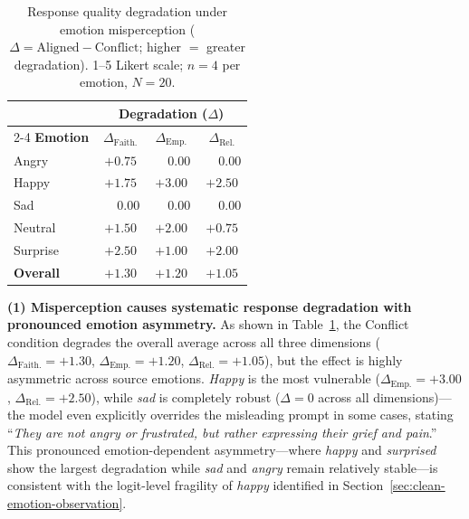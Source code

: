 \begin{table}[!t]
\centering
\small
\caption{Response quality degradation under emotion misperception ($\Delta = \text{Aligned} - \text{Conflict}$; higher $=$ greater degradation). 1--5 Likert scale; $n{=}4$ per emotion, $N{=}20$.}
\label{tab:q2_results}
\setlength{\tabcolsep}{8pt}
\begin{tabular}{l@{\hskip 12pt}c@{\hskip 10pt}c@{\hskip 10pt}c}
\toprule
 & \multicolumn{3}{c}{\textbf{Degradation} ($\Delta$)} \\
\cmidrule(lr){2-4}
\textbf{Emotion} & $\Delta_{\text{Faith.}}$ & $\Delta_{\text{Emp.}}$ & $\Delta_{\text{Rel.}}$ \\
\midrule
Angry     & $+0.75$          & $\phantom{+}0.00$ & $\phantom{+}0.00$ \\
Happy     & $+1.75$          & $+3.00$            & $+2.50$            \\
\rowcolor{gray!12}
Sad       & $\phantom{+}0.00$ & $\phantom{+}0.00$ & $\phantom{+}0.00$ \\
Neutral   & $+1.50$          & $+2.00$            & $+0.75$            \\
Surprise  & $+2.50$          & $+1.00$            & $+2.00$            \\
\midrule
\textbf{Overall} & $\boldsymbol{+1.30}$ & $\boldsymbol{+1.20}$ & $\boldsymbol{+1.05}$ \\
\bottomrule
\end{tabular}
\end{table}

\textbf{(1) Misperception causes systematic response degradation with pronounced emotion asymmetry.}
As shown in Table~\ref{tab:q2_results}, the Conflict condition degrades the overall average across all three dimensions ($\Delta_{\text{Faith.}} = +1.30$, $\Delta_{\text{Emp.}} = +1.20$, $\Delta_{\text{Rel.}} = +1.05$), but the effect is highly asymmetric across source emotions. \textit{Happy} is the most vulnerable ($\Delta_{\text{Emp.}} = +3.00$, $\Delta_{\text{Rel.}} = +2.50$), while \textit{sad} is completely robust ($\Delta = 0$ across all dimensions)---the model even explicitly overrides the misleading prompt in some cases, stating ``\textit{They are not angry or frustrated, but rather expressing their grief and pain}.'' This pronounced emotion-dependent asymmetry---where \textit{happy} and \textit{surprised} show the largest degradation while \textit{sad} and \textit{angry} remain relatively stable---is consistent with the logit-level fragility of \textit{happy} identified in Section~\ref{sec:clean-emotion-observation}.

